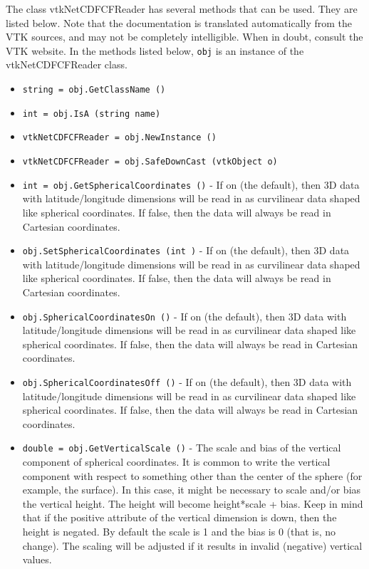 The class vtkNetCDFCFReader has several methods that can be used.
  They are listed below.
Note that the documentation is translated automatically from the VTK sources,
and may not be completely intelligible.  When in doubt, consult the VTK website.
In the methods listed below, \verb|obj| is an instance of the vtkNetCDFCFReader class.
\begin{itemize}
\item  \verb|string = obj.GetClassName ()|

\item  \verb|int = obj.IsA (string name)|

\item  \verb|vtkNetCDFCFReader = obj.NewInstance ()|

\item  \verb|vtkNetCDFCFReader = obj.SafeDownCast (vtkObject o)|

\item  \verb|int = obj.GetSphericalCoordinates ()| -  If on (the default), then 3D data with latitude/longitude dimensions
 will be read in as curvilinear data shaped like spherical coordinates.
 If false, then the data will always be read in Cartesian coordinates.

\item  \verb|obj.SetSphericalCoordinates (int )| -  If on (the default), then 3D data with latitude/longitude dimensions
 will be read in as curvilinear data shaped like spherical coordinates.
 If false, then the data will always be read in Cartesian coordinates.

\item  \verb|obj.SphericalCoordinatesOn ()| -  If on (the default), then 3D data with latitude/longitude dimensions
 will be read in as curvilinear data shaped like spherical coordinates.
 If false, then the data will always be read in Cartesian coordinates.

\item  \verb|obj.SphericalCoordinatesOff ()| -  If on (the default), then 3D data with latitude/longitude dimensions
 will be read in as curvilinear data shaped like spherical coordinates.
 If false, then the data will always be read in Cartesian coordinates.

\item  \verb|double = obj.GetVerticalScale ()| -  The scale and bias of the vertical component of spherical coordinates.  It
 is common to write the vertical component with respect to something other
 than the center of the sphere (for example, the surface).  In this case, it
 might be necessary to scale and/or bias the vertical height.  The height
 will become height*scale + bias.  Keep in mind that if the positive
 attribute of the vertical dimension is down, then the height is negated.
 By default the scale is 1 and the bias is 0 (that is, no change).  The
 scaling will be adjusted if it results in invalid (negative) vertical
 values.


\end{itemize}
